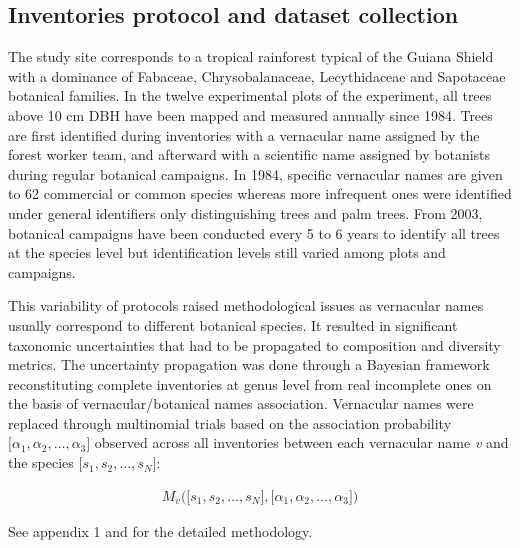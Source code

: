 \documentclass[fleqn,10pt]{ArtEcoFoG} %
\theoremstyle{definition}
\theoremstyle{definition}
\theoremstyle{definition}
\theoremstyle{remark}
\begin{document}
\subsection{Inventories protocol and dataset
collection}\label{protocols}

The study site corresponds to a tropical rainforest typical of the
Guiana Shield with a dominance of Fabaceae, Chrysobalanaceae,
Lecythidaceae and Sapotaceae botanical families. In the twelve
experimental plots of the experiment, all trees above 10 cm DBH have
been mapped and measured annually since 1984. Trees are first identified
during inventories with a vernacular name assigned by the forest worker
team, and afterward with a scientific name assigned by botanists during
regular botanical campaigns. In 1984, specific vernacular names are
given to 62 commercial or common species whereas more infrequent ones
were identified under general identifiers only distinguishing trees and
palm trees. From 2003, botanical campaigns have been conducted every 5
to 6 years to identify all trees at the species level but identification
levels still varied among plots and campaigns.

This variability of protocols raised methodological issues as vernacular
names usually correspond to different botanical species. It resulted in
significant taxonomic uncertainties that had to be propagated to
composition and diversity metrics. The uncertainty propagation was done
through a Bayesian framework reconstituting complete inventories at
genus level from real incomplete ones on the basis of
vernacular/botanical names association. Vernacular names were replaced
through multinomial trials based on the association probability
\(\big[\alpha_1, \alpha_2,…, \alpha_3\big]\) observed across all
inventories between each vernacular name \emph{v} and the species
\(\big[s_1, s_2, …, s_N\big]\):

\begin{align}
M_v\Big(\big[s_1, s_2, …, s_N\big],\big[\alpha_1, \alpha_2,…, \alpha_3\big]\Big) \nonumber
\end{align}

See appendix 1 and \citet{Aubry-Kientz2013} for the detailed
methodology.
\end{document}
